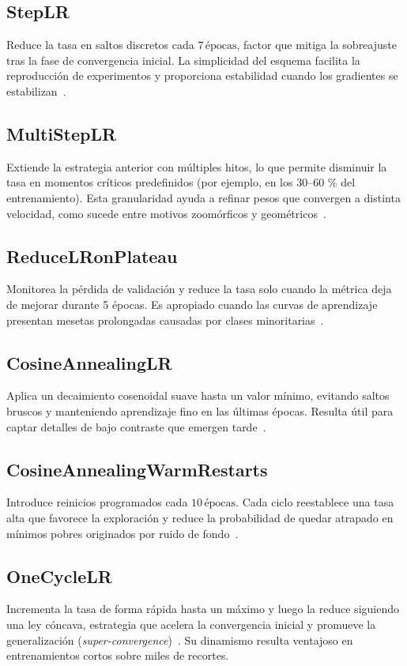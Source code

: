 \subsection*{StepLR}
Reduce la tasa en saltos discretos cada \(7\,\text{épocas}\), factor que mitiga la sobreajuste tras la fase de convergencia inicial.
La simplicidad del esquema facilita la reproducción de experimentos y proporciona estabilidad cuando los gradientes se estabilizan~\cite{goyal2017}.

\subsection*{MultiStepLR}
Extiende la estrategia anterior con múltiples hitos, lo que permite disminuir la tasa en momentos críticos predefinidos (por ejemplo, en los \(30\text{–}60\) \% del entrenamiento).
Esta granularidad ayuda a refinar pesos que convergen a distinta velocidad, como sucede entre motivos zoomórficos y geométricos~\cite{he2016}.

\subsection*{ReduceLRonPlateau}
Monitorea la pérdida de validación y reduce la tasa solo cuando la métrica deja de mejorar durante 5 épocas.
Es apropiado cuando las curvas de aprendizaje presentan mesetas prolongadas causadas por clases minoritarias~\cite{hinton2012}.

\subsection*{CosineAnnealingLR}
Aplica un decaimiento cosenoidal suave hasta un valor mínimo, evitando saltos bruscos y manteniendo aprendizaje fino en las últimas épocas.
Resulta útil para captar detalles de bajo contraste que emergen tarde~\cite{loshchilov2017}.

\subsection*{CosineAnnealingWarmRestarts}
Introduce reinicios programados cada \(10\,\text{épocas}\). Cada ciclo reestablece una tasa alta que favorece la exploración y reduce la probabilidad de quedar atrapado en mínimos pobres originados por ruido de fondo~\cite{loshchilov2017}.

\subsection*{OneCycleLR}
Incrementa la tasa de forma rápida hasta un máximo y luego la reduce siguiendo una ley cóncava, estrategia que acelera la convergencia inicial y promueve la generalización (\emph{super-convergence})~\cite{smith2019}.
Su dinamismo resulta ventajoso en entrenamientos cortos sobre miles de recortes.

